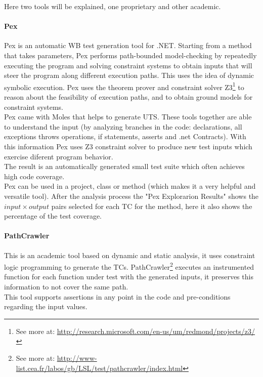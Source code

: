 Here two tools will be explained, one proprietary and other academic.

\paragraph{Pex} Pex\cite{Tillmann:2008:PWB:1792786.1792798} is an automatic \ac{WB} test generation tool for .NET. Starting from a
method that takes parameters, Pex performs path-bounded model-checking
by repeatedly executing the program and solving constraint systems to obtain inputs that will steer the program along different execution paths.
This uses the idea of dynamic symbolic execution\cite{Tillmann06unittests}. Pex uses the theorem prover and
constraint solver Z3\footnote{See more at: \url{http://research.microsoft.com/en-us/um/redmond/projects/z3/}} to reason about the feasibility of execution paths, and
to obtain ground models for constraint systems.\\
Pex came with Moles that helps to generate \ac{UTS}. These tools together are able to understand the input (by analyzing branches in the code:
declarations, all exceptions throws operations, if statements, asserts and .net Contracts). With this information Pex uses Z3 constraint solver to
produce new test inputs which exercise diferent program behavior.\\
The result is an automatically generated small test suite which often achieves high code coverage.\\
Pex can be used in a project, class or method (which makes it a very helpful and versatile tool). After the analysis process the "Pex Explorarion Results" shows
the $input \times output$ pairs selected for each \ac{TC} for the method, here it also shows the percentage of the test coverage.

\paragraph{PathCrawler} This is an academic tool based on dynamic and static analysis\cite{Williams05pathcrawler:automatic}, 
it uses constraint logic programming to generate the \ac{TC}s. PathCrawler\footnote{See more at: \url{http://www-list.cea.fr/labos/gb/LSL/test/pathcrawler/index.html}} executes an instrumented function for each function under test
with the generated inputs, it preserves this information to not cover the same path.\\
This tool supports assertions in any point in the code and pre-conditions regarding the input values.


